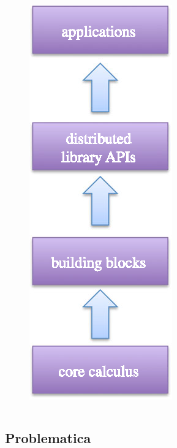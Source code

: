 \begin{frame}{\insertsectionhead}{\insertsubsectionhead}
\begin{columns}
\begin{column}{.25\textwidth}
\begin{figure}
            \includegraphics[height=.7\textheight]{res/fig/stack-partial.eps}
          \end{figure}
        \end{column}
      \end{columns}
    \end{frame}

  \subsection{Problematica}

